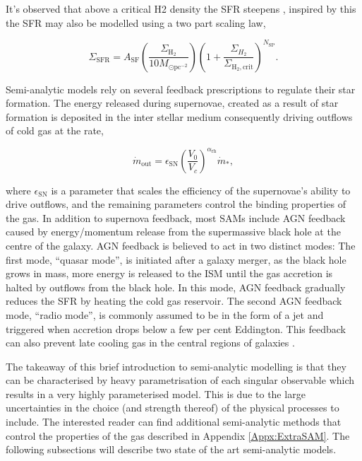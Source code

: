 It's observed that above a critical H2 density the SFR steepens \citep{Narayanan2012ALaw}, inspired by this the SFR may also be modelled using a two part scaling law, 

\begin{equation}
    \Sigma_{\mathrm{SFR}}=A_{\mathrm{SF}}\left(\frac{\Sigma_{\mathrm{H}_{2}}}{10 M_{\odot \mathrm{pc}^{-2}}}\right)\left(1+\frac{\Sigma_{H_{2}}}{\Sigma_{\mathrm{H}_{2}, \mathrm{crit}}}\right)^{N_{\mathrm{SP}}}.
\end{equation}

Semi-analytic models rely on several feedback prescriptions to regulate their star formation. The energy released during supernovae, created as a result of star formation is deposited in the inter stellar medium consequently driving outflows of cold gas at the rate,

\begin{equation}
    \dot{m}_{\mathrm{out}}=\epsilon_{\mathrm{SN}}\left(\frac{V_{0}}{V_{c}}\right)^{\alpha_{\mathrm{rh}}} \dot{m}_{*},
\end{equation}

where $\epsilon_{\mathrm{SN}}$ is a parameter that scales the efficiency of the supernovae's ability to drive outflows, and the remaining parameters control the binding properties of the gas. In addition to supernova feedback, most SAMs include AGN feedback caused by energy/momentum release from the supermassive black hole at the centre of the galaxy. AGN feedback is believed to act in two distinct modes: The first mode, ``quasar mode'', is initiated after a galaxy merger, as the black hole grows in mass, more energy is released to the ISM until the gas accretion is halted by outflows from the black hole. In this mode, AGN feedback gradually reduces the SFR by heating the cold gas reservoir. The second AGN feedback mode, ``radio mode'', is commonly assumed to be in the form of a jet and triggered when accretion drops below a few per cent Eddington. This feedback can also prevent late cooling gas in the central regions of galaxies \cite{Croton2007Thequenching}.

The takeaway of this brief introduction to semi-analytic modelling is that they can be characterised by heavy parametrisation of each singular observable which results in a very highly parameterised model. This is due to the large uncertainties in the choice (and strength thereof) of the physical processes to include. The interested reader can find additional semi-analytic methods that control the properties of the gas described in Appendix \ref{Appx:ExtraSAM}. The following subsections will describe two state of the art semi-analytic models.

